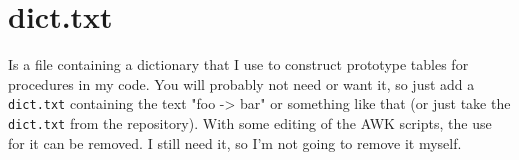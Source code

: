 \section{dict.txt}
\label{dicttxt}

Is a file containing a dictionary that I use to construct prototype tables for procedures in my code. You will probably not need or want it, so just add a \texttt{dict.txt} containing the text "foo -> bar" or something like that (or just take the \texttt{dict.txt} from the repository). With some editing of the AWK scripts, the use for it can be removed. I still need it, so I'm not going to remove it myself.


